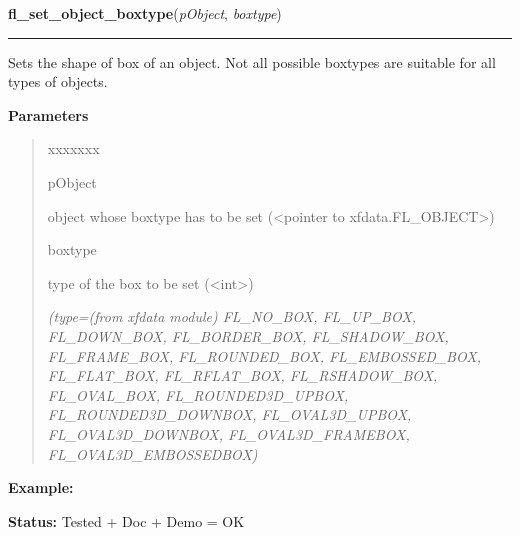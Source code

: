 \hspace{.8\funcindent}\begin{boxedminipage}{\funcwidth}

    \raggedright \textbf{fl\_set\_object\_boxtype}(\textit{pObject}, \textit{boxtype})

    \vspace{-1.5ex}

    \rule{\textwidth}{0.5\fboxrule}
\setlength{\parskip}{2ex}
    Sets the shape of box of an object. Not all possible boxtypes are 
    suitable for all types of objects.

\setlength{\parskip}{1ex}
      \textbf{Parameters}
      \vspace{-1ex}

      \begin{quote}
        \begin{Ventry}{xxxxxxx}

          \item[pObject]

          object whose boxtype has to be set ({\textless}pointer to 
          xfdata.FL\_OBJECT{\textgreater})

          \item[boxtype]

          type of the box to be set ({\textless}int{\textgreater})

            {\it (type=(from xfdata module) FL\_NO\_BOX, FL\_UP\_BOX, FL\_DOWN\_BOX, 
FL\_BORDER\_BOX, FL\_SHADOW\_BOX, FL\_FRAME\_BOX, FL\_ROUNDED\_BOX, 
FL\_EMBOSSED\_BOX, FL\_FLAT\_BOX, FL\_RFLAT\_BOX, FL\_RSHADOW\_BOX, 
FL\_OVAL\_BOX, FL\_ROUNDED3D\_UPBOX, FL\_ROUNDED3D\_DOWNBOX, 
FL\_OVAL3D\_UPBOX, FL\_OVAL3D\_DOWNBOX, FL\_OVAL3D\_FRAMEBOX, 
FL\_OVAL3D\_EMBOSSEDBOX)}

        \end{Ventry}

      \end{quote}

\textbf{Example:} 

\textbf{Status:} Tested + Doc + Demo = OK



    \end{boxedminipage}

    \label{xformslib:library:fl_get_object_boxtype}

    \vspace{0.5ex}

